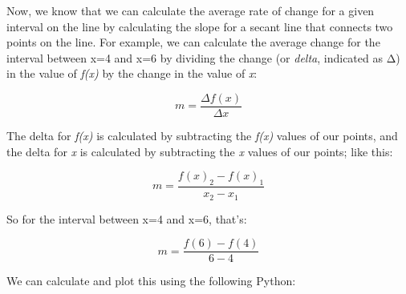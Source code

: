 \documentclass[11pt]{article}
\begin{document}
    Now, we know that we can calculate the average rate of change for a
given interval on the line by calculating the slope for a secant line
that connects two points on the line. For example, we can calculate the
average change for the interval between x=4 and x=6 by dividing the
change (or \emph{delta}, indicated as Δ) in the value of \emph{f(x)} by
the change in the value of \emph{x}:

\begin{equation}m = \frac{\Delta{f(x)}}{\Delta{x}} \end{equation}

The delta for \emph{f(x)} is calculated by subtracting the \emph{f(x)}
values of our points, and the delta for \emph{x} is calculated by
subtracting the \emph{x} values of our points; like this:

\begin{equation}m = \frac{f(x)_{2} - f(x)_{1}}{x_{2} - x_{1}} \end{equation}

So for the interval between x=4 and x=6, that's:

\begin{equation}m = \frac{f(6) - f(4)}{6 - 4} \end{equation}

We can calculate and plot this using the following Python:
\end{document}
